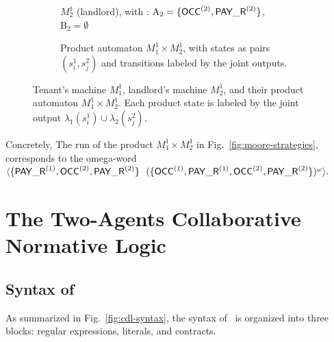 \documentclass{article}
\begin{document}
\begin{example}
\begin{figure}[h]
\begin{subfigure}[t]{0.70\textwidth}
{}
  \caption{$M_2^1$ (landlord), with : $\mathrm{A_2}=\{\mathsf{OCC}^{(2)},\mathsf{PAY\_R}^{(2)}\}$, $\mathrm{B_2}=\emptyset$}
  \label{fig:moore-landlord-prod}
  \end{subfigure}
  \vspace{0.5cm}
  \begin{subfigure}[t]{0.70\textwidth}
  \centering
  \caption{Product automaton $M_1^1 \times M_2^1$, with states as pairs $(s_i^1,s_j^2)$ and transitions labeled by the joint outputs.}
  \label{fig:product-sketch}
  \end{subfigure}
  
  \caption{Tenant’s machine $M_1^1$, landlord’s machine $M_2^1$, and their product 
  automaton $M_1^1 \times M_2^1$. 
  Each product state is labeled by the joint output $\lambda_1(s_i^1)\cup\lambda_2(s_j^2)$.}
  \label{fig:moore-product-full}
  \end{figure}
  
  \noindent
  Concretely, The run of the product $M_1^1 \times M_2^1$ in  Fig.~\ref{fig:moore-strategies}, corresponds to the omega-word\\
  $\langle \{\mathsf{PAY\_R}^{(1)},\mathsf{OCC}^{(2)},\mathsf{PAY\_R}^{(2)}\}~\
   (\{\mathsf{OCC}^{(1)},\mathsf{PAY\_R}^{(1)},\mathsf{OCC}^{(2)},\mathsf{PAY\_R}^{(2)}\})^\omega \rangle .$
  \end{example}
  
  
  
  \section{The Two-Agents Collaborative Normative Logic \cDL}
  \subsection{Syntax of \cDL}
  As summarized in Fig.~\ref{fig:cdl-syntax}, the syntax of \cDL\ is organized into three blocks: regular expressions, literals, and contracts.
  
\end{document}

